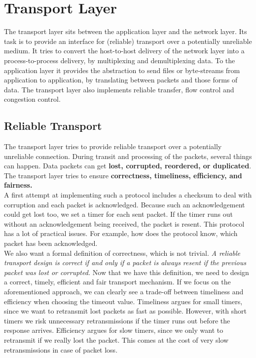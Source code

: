 \section{Transport Layer}
The transport layer sits between the application layer and the network layer. Its task is to provide an interface for (reliable) transport over a potentially unreliable medium. It tries to convert the host-to-host delivery of the network layer into a process-to-process delivery, by multiplexing and demultiplexing data. To the application layer it provides the abstraction to send files or byte-streams from application to application, by translating between packets and those forms of data. The transport layer also implements reliable transfer, flow control and congestion control.

\subsection{Reliable Transport}
The transport layer tries to provide reliable transport over a potentially unreliable connection. During transit and processing of the packets, several things can happen. Data packets can get \textbf{lost, corrupted, reordered, or duplicated}. The transport layer tries to ensure \textbf{correctness, timeliness,  efficiency, and fairness.} \vspace{.3cm}\\
A first attempt at implementing such a protocol includes a checksum to deal with corruption and each packet is acknowledged. Because such an acknowledgement could get lost too, we set a timer for each sent packet. If the timer runs out without an acknowledgement being received, the packet is resent. This protocol has a lot of practical issues. For example, how does the protocol know, which packet has been acknowledged. \vspace{.3cm}\\
We also want a formal definition of correctness, which is not trivial. \textit{A reliable transport design is correct if and only if a packet is always resent if the previous packet was lost or corrupted.} Now that we have this definition, we need to design a correct, timely, efficient and fair transport mechanism. If we focus on the aforementioned approach, we can clearly see a trade-off between timeliness and efficiency when choosing the timeout value. Timeliness argues for small timers, since we want to retransmit lost packets as fast as possible. However, with short timers we risk unnecessary retransmissions if the timer runs out before the response arrives. Efficiency argues for slow timers, since we only want to retransmit if we really lost the packet. This comes at the cost of very slow retransmissions in case of packet loss. \vspace{.3cm}\\

